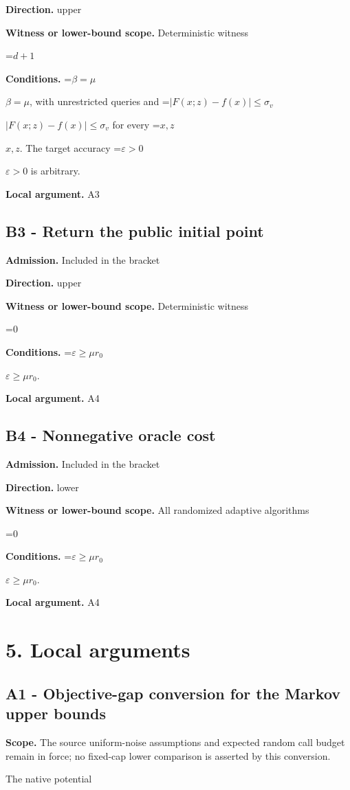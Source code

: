 \documentclass[10pt,a4paper]{article}
\newcommand{\AtlasMath}[1]{\par\begingroup\centering\setbox0=\hbox{$\displaystyle #1$}\ifdim\wd0>1.4\linewidth\typeout{ATLAS WIDE FORMULA: \the\wd0}\fi\ifdim\wd0>\linewidth\resizebox{\linewidth}{!}{\box0}\else\box0\fi\par\endgroup}
\newcommand{\AtlasInlineMath}[1]{\begingroup\setbox0=\hbox{$#1$}\ifdim\wd0>.4\linewidth\endgroup\AtlasMath{#1}\else\endgroup$#1$\fi}
\begin{document}
\textbf{Direction.} upper

\textbf{Witness or lower-bound scope.} Deterministic witness

\AtlasMath{d+1}
\textbf{Conditions.} \AtlasInlineMath{\beta=\mu}, with unrestricted queries and \AtlasInlineMath{|F(x;z)-f(x)|\le\sigma_v} for every \AtlasInlineMath{x,z}. The target accuracy \AtlasInlineMath{\varepsilon>0} is arbitrary.

\textbf{Local argument.} A3

\subsection{B3 - Return the public initial point}
\textbf{Admission.} Included in the bracket

\textbf{Direction.} upper

\textbf{Witness or lower-bound scope.} Deterministic witness

\AtlasMath{0}
\textbf{Conditions.} \AtlasInlineMath{\varepsilon\ge\mu r_0}.

\textbf{Local argument.} A4

\subsection{B4 - Nonnegative oracle cost}
\textbf{Admission.} Included in the bracket

\textbf{Direction.} lower

\textbf{Witness or lower-bound scope.} All randomized adaptive algorithms

\AtlasMath{0}
\textbf{Conditions.} \AtlasInlineMath{\varepsilon\ge\mu r_0}.

\textbf{Local argument.} A4

\section{5. Local arguments}
\subsection{A1 - Objective-gap conversion for the Markov upper bounds}
\textbf{Scope.} The source uniform-noise assumptions and expected random call budget remain in force; no fixed-cap lower comparison is asserted by this conversion.

The native potential
\end{document}
